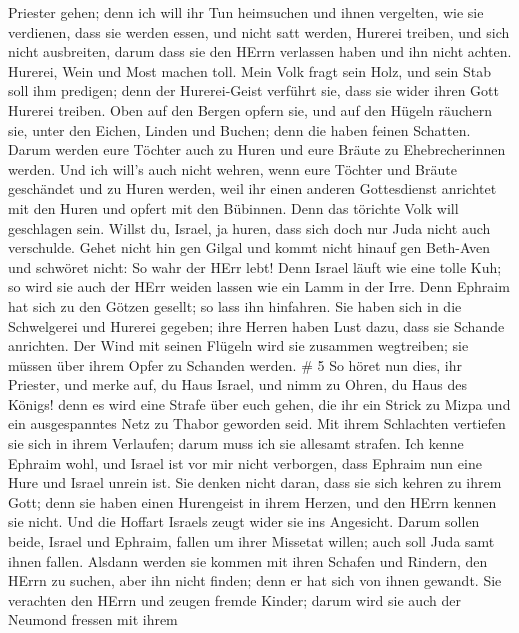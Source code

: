 Priester gehen; denn ich will ihr Tun heimsuchen und ihnen vergelten,
wie sie verdienen,  dass sie werden essen, und nicht satt
werden, Hurerei treiben, und sich nicht ausbreiten, darum dass sie den
HErrn verlassen haben und ihn nicht achten.  Hurerei, Wein
und Most machen toll.  Mein Volk fragt sein Holz, und sein
Stab soll ihm predigen; denn der Hurerei-Geist verführt sie, dass sie
wider ihren Gott Hurerei treiben.  Oben auf den Bergen
opfern sie, und auf den Hügeln räuchern sie, unter den Eichen, Linden
und Buchen; denn die haben feinen Schatten. Darum werden eure Töchter
auch zu Huren und eure Bräute zu Ehebrecherinnen werden. 
Und ich will's auch nicht wehren, wenn eure Töchter und Bräute
geschändet und zu Huren werden, weil ihr einen anderen Gottesdienst
anrichtet mit den Huren und opfert mit den Bübinnen. Denn das törichte
Volk will geschlagen sein.  Willst du, Israel, ja huren,
dass sich doch nur Juda nicht auch verschulde. Gehet nicht hin gen
Gilgal und kommt nicht hinauf gen Beth-Aven und schwöret nicht: So wahr
der HErr lebt!  Denn Israel läuft wie eine tolle Kuh; so
wird sie auch der HErr weiden lassen wie ein Lamm in der Irre.
 Denn Ephraim hat sich zu den Götzen gesellt; so lass ihn
hinfahren.  Sie haben sich in die Schwelgerei und Hurerei
gegeben; ihre Herren haben Lust dazu, dass sie Schande anrichten.
 Der Wind mit seinen Flügeln wird sie zusammen wegtreiben;
sie müssen über ihrem Opfer zu Schanden werden. \# 5  So
höret nun dies, ihr Priester, und merke auf, du Haus Israel, und nimm zu
Ohren, du Haus des Königs! denn es wird eine Strafe über euch gehen, die
ihr ein Strick zu Mizpa und ein ausgespanntes Netz zu Thabor geworden
seid.  Mit ihrem Schlachten vertiefen sie sich in ihrem
Verlaufen; darum muss ich sie allesamt strafen.  Ich kenne
Ephraim wohl, und Israel ist vor mir nicht verborgen, dass Ephraim nun
eine Hure und Israel unrein ist.  Sie denken nicht daran,
dass sie sich kehren zu ihrem Gott; denn sie haben einen Hurengeist in
ihrem Herzen, und den HErrn kennen sie nicht.  Und die
Hoffart Israels zeugt wider sie ins Angesicht. Darum sollen beide,
Israel und Ephraim, fallen um ihrer Missetat willen; auch soll Juda samt
ihnen fallen.  Alsdann werden sie kommen mit ihren Schafen
und Rindern, den HErrn zu suchen, aber ihn nicht finden; denn er hat
sich von ihnen gewandt.  Sie verachten den HErrn und zeugen
fremde Kinder; darum wird sie auch der Neumond fressen mit ihrem
